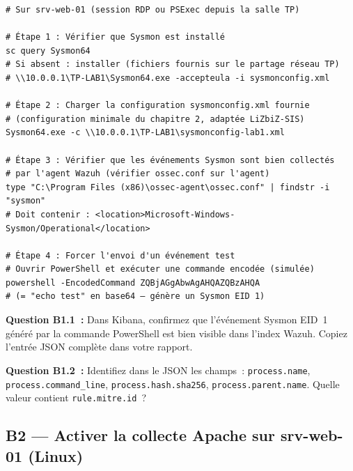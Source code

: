 \begin{lstlisting}[style=StyleTerminal,
  caption={Déploiement et configuration Sysmon sur srv-web-01},
  label={lst:lab1-sysmon}]
# Sur srv-web-01 (session RDP ou PSExec depuis la salle TP)

# Étape 1 : Vérifier que Sysmon est installé
sc query Sysmon64
# Si absent : installer (fichiers fournis sur le partage réseau TP)
# \\10.0.0.1\TP-LAB1\Sysmon64.exe -accepteula -i sysmonconfig.xml

# Étape 2 : Charger la configuration sysmonconfig.xml fournie
# (configuration minimale du chapitre 2, adaptée LiZbiZ-SIS)
Sysmon64.exe -c \\10.0.0.1\TP-LAB1\sysmonconfig-lab1.xml

# Étape 3 : Vérifier que les événements Sysmon sont bien collectés
# par l'agent Wazuh (vérifier ossec.conf sur l'agent)
type "C:\Program Files (x86)\ossec-agent\ossec.conf" | findstr -i "sysmon"
# Doit contenir : <location>Microsoft-Windows-Sysmon/Operational</location>

# Étape 4 : Forcer l'envoi d'un événement test
# Ouvrir PowerShell et exécuter une commande encodée (simulée)
powershell -EncodedCommand ZQBjAGgAbwAgAHQAZQBzAHQA
# (= "echo test" en base64 — génère un Sysmon EID 1)
\end{lstlisting}

\begin{boxexo}
\textbf{Question B1.1~:} Dans Kibana, confirmez que l'événement Sysmon
EID~1 généré par la commande PowerShell est bien visible dans l'index
Wazuh. Copiez l'entrée JSON complète dans votre rapport.

\medskip\textbf{Question B1.2~:} Identifiez dans le JSON les champs~:
\texttt{process.name}, \texttt{process.command\_line}, \texttt{process.hash.sha256},
\texttt{process.parent.name}. Quelle valeur contient \texttt{rule.mitre.id}~?
\end{boxexo}

\subsection{B2 — Activer la collecte Apache sur srv-web-01 (Linux)}

